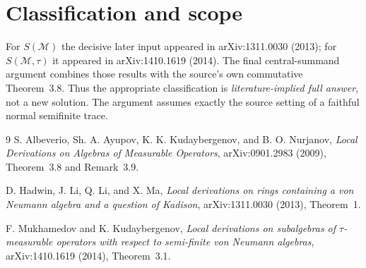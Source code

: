 \documentclass[11pt]{article}
\newcommand{\M}{\mathcal M}
\begin{document}
\section*{Classification and scope}

For $S(\M)$ the decisive later input appeared in arXiv:1311.0030 (2013); for
$S(\M,\tau)$ it appeared in arXiv:1410.1619 (2014). The final central-summand
argument combines those results with the source's own commutative Theorem~3.8.
Thus the appropriate classification is \emph{literature-implied full answer},
not a new solution. The argument assumes exactly the source setting of a
faithful normal semifinite trace.

\begin{thebibliography}{9}
S. Albeverio, Sh. A. Ayupov, K. K. Kudaybergenov, and B. O. Nurjanov,
\emph{Local Derivations on Algebras of Measurable Operators},
arXiv:0901.2983 (2009), Theorem~3.8 and Remark~3.9.

D. Hadwin, J. Li, Q. Li, and X. Ma,
\emph{Local derivations on rings containing a von Neumann algebra and a
question of Kadison}, arXiv:1311.0030 (2013), Theorem~1.

F. Mukhamedov and K. Kudaybergenov,
\emph{Local derivations on subalgebras of $\tau$-measurable operators with
respect to semi-finite von Neumann algebras}, arXiv:1410.1619 (2014),
Theorem~3.1.
\end{thebibliography}
\end{document}
